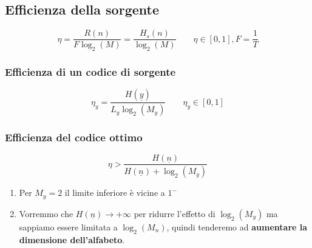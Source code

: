 \documentclass{article}
\begin{document}
\subsection{Efficienza della sorgente}
$$\eta=\frac{R(n)}{F\log_2(M)}=\frac{H_s(n)}{\log_2(M)}\qquad \eta\in[0,1],F=\frac{1}{T}$$

\subsubsection{Efficienza di un codice di sorgente}
$$\eta_y=\frac{H(\underline{y})}{L_y\log_2(M_y)}\qquad\eta_y\in[0,1]$$

\subsubsection{Efficienza del codice ottimo}
$$\eta>\frac{H(\underline{n})}{H(\underline{n})+\log_2(M_y)}$$
\begin{enumerate}
	\item Per $M_y=2$ il limite inferiore è vicine a $1^-$
	\item Vorremmo che $H(\underline{n})\rightarrow+\infty$ per ridurre l'effetto di $\log_2(M_y)$ ma sappiamo essere limitata a $\log_2(M_n)$, quindi tenderemo ad \textbf{aumentare la dimensione dell'alfabeto}.
\end{enumerate}
\end{document}
